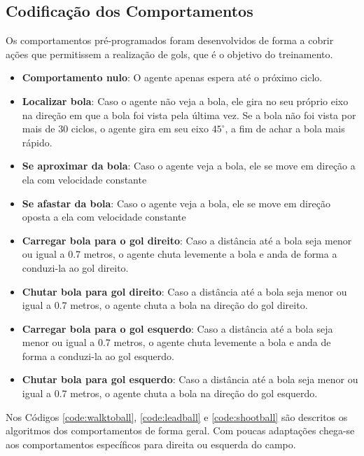 \subsection{Codificação dos Comportamentos}
\label{subsubsec:behaviors-mapping}
Os comportamentos pré-programados foram desenvolvidos de forma a cobrir ações que permitissem a realização de gols, que é o objetivo do treinamento.

\begin{itemize}
	
	\item \textbf{Comportamento nulo}: O agente apenas espera até o próximo ciclo.
	
	\item \textbf{Localizar bola}: Caso o agente não veja a bola, ele gira no seu próprio eixo na direção em que a bola foi vista pela última vez. Se a bola não foi vista por mais de 30 ciclos, o agente gira em seu eixo $45^{\circ}$, a fim de achar a bola mais rápido. 
	
	\item \textbf{Se aproximar da bola}: Caso o agente veja a bola, ele se move em direção a ela com velocidade constante
	
	\item \textbf{Se afastar da bola}: Caso o agente veja a bola, ele se move em direção oposta a ela com velocidade constante
	
	\item \textbf{Carregar bola para o gol direito}: Caso a distância até a bola seja menor ou igual a 0.7 metros, o agente chuta levemente a bola e anda de forma a conduzi-la ao gol direito.
	
	\item \textbf{Chutar bola para gol direito}: Caso a distância até a bola seja menor ou igual a 0.7 metros, o agente chuta a bola na direção do gol direito.
	
	\item \textbf{Carregar bola para o gol esquerdo}: Caso a distância até a bola seja menor ou igual a 0.7 metros, o agente chuta levemente a bola e anda de forma a conduzi-la ao gol esquerdo.
	
	\item \textbf{Chutar bola para gol esquerdo}: Caso a distância até a bola seja menor ou igual a 0.7 metros, o agente chuta a bola na direção do gol esquerdo.
	
\end{itemize}

Nos Códigos \ref{code:walktoball}, \ref{code:leadball} e \ref{code:shootball} são descritos os algoritmos dos comportamentos de forma geral. Com poucas adaptações chega-se aos comportamentos específicos para direita ou esquerda do campo.


